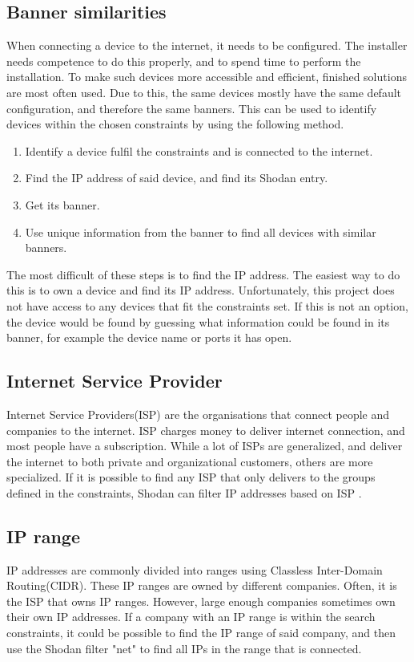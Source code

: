 \subsection{Banner similarities}
When connecting a device to the internet, it needs to be configured. The installer needs competence to do this properly, and to spend time to perform the installation. To make such devices more accessible and efficient, finished solutions are most often used. Due to this, the same devices mostly have the same default configuration, and therefore the same banners. This can be used to identify devices within the chosen constraints by using the following method.
\begin{enumerate}
    \item Identify a device fulfil the constraints and is connected to the internet.
    \item Find the IP address of said device, and find its Shodan entry.
    \item Get its banner.
    \item Use unique information from the banner to find all devices with similar banners.
\end{enumerate}
The most difficult of these steps is to find the IP address. The easiest way to do this is to own a device and find its IP address. Unfortunately, this project does not have access to any devices that fit the constraints set.
If this is not an option, the device would be found by guessing what information could be found in its banner, for example the device name or ports it has open.

\subsection{Internet Service Provider}
Internet Service Providers(ISP) are the organisations that connect people and companies to the internet. ISP charges money to deliver internet connection, and most people have a subscription. While a lot of ISPs are generalized, and deliver the internet to both private and organizational customers, others are more specialized. If it is possible to find any ISP that only delivers to the groups defined in the constraints, Shodan can filter IP addresses based on ISP .

\subsection{IP range}
IP addresses are commonly divided into ranges using Classless Inter-Domain Routing(CIDR). These IP ranges are owned by different companies. Often, it is the ISP that owns IP ranges. However, large enough companies sometimes own their own IP addresses. If a company with an IP range is within the search constraints, it could be possible to find the IP range of said company, and then use the Shodan filter "net" to find all IPs in the range that is connected.

